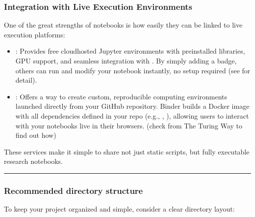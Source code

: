 \documentclass[letterpaper,10pt,english]{jupyterBook}
\begin{document}
\subsubsection{Integration with Live Execution Environments}
\label{\detokenize{chapters/02/02b_jupyter-notebooks:integration-with-live-execution-environments}}
\sphinxAtStartPar
One of the great strengths of notebooks is how easily they can be linked to live execution platforms:
\begin{itemize}
\item {} 
\sphinxAtStartPar
{}: Provides free cloud\sphinxhyphen{}hosted Jupyter environments with pre\sphinxhyphen{}installed libraries, GPU support, and seamless integration with . By simply adding a  badge, others can run and modify your notebook instantly, no setup required (see  for detail).

\item {} 
\sphinxAtStartPar
{}: Offers a way to create custom, reproducible computing environments launched directly from your GitHub repository. Binder builds a Docker image with all dependencies defined in your repo (e.g., , ), allowing users to interact with your notebooks live in their browsers. (check  from The Turing Way to find out how)

\end{itemize}

\sphinxAtStartPar
These services make it simple to share not just static scripts, but fully executable research notebooks.


\bigskip\hrule\bigskip



\subsubsection{Recommended directory structure}
\label{\detokenize{chapters/02/02b_jupyter-notebooks:recommended-directory-structure}}
\sphinxAtStartPar
To keep your project organized and simple, consider a clear directory layout:
\end{document}
